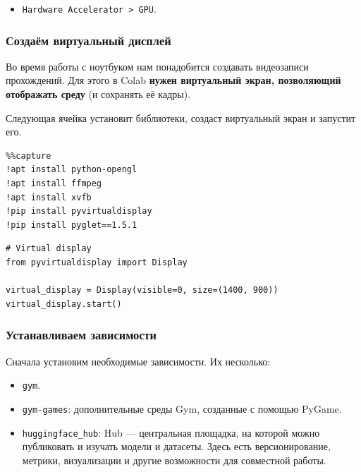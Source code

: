 \documentclass[11pt,a4paper]{article}
\begin{document}

\begin{itemize}
\tightlist
\item
  \texttt{Hardware\ Accelerator\ \textgreater{}\ GPU}.
\end{itemize}


\subsubsection{Создаём виртуальный дисплей}\label{create-a-virtual-display}

Во время работы с ноутбуком нам понадобится создавать видеозаписи прохождений. Для этого в Colab \textbf{нужен виртуальный экран, позволяющий отображать среду} (и сохранять её кадры).

Следующая ячейка установит библиотеки, создаст виртуальный экран и запустит его.

\begin{lstlisting}
%%capture
!apt install python-opengl
!apt install ffmpeg
!apt install xvfb
!pip install pyvirtualdisplay
!pip install pyglet==1.5.1
\end{lstlisting}

\begin{lstlisting}
# Virtual display
from pyvirtualdisplay import Display

virtual_display = Display(visible=0, size=(1400, 900))
virtual_display.start()
\end{lstlisting}

\subsubsection{Устанавливаем зависимости}\label{install-the-dependencies}

Сначала установим необходимые зависимости. Их несколько:

\begin{itemize}
\tightlist
\item
  \texttt{gym}.
\item
  \texttt{gym-games}: дополнительные среды Gym, созданные с помощью PyGame.
\item
  \texttt{huggingface\_hub}: Hub --- центральная площадка, на которой можно публиковать и изучать модели и датасеты. Здесь есть версионирование, метрики, визуализации и другие возможности для совместной работы.
\end{itemize}
\end{document}
